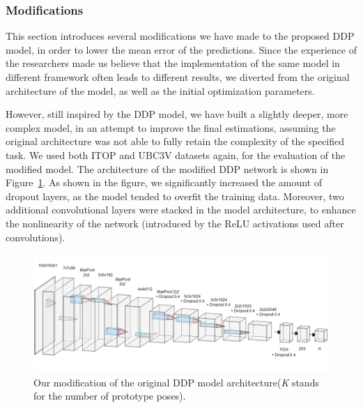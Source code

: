 \subsubsection{Modifications}
This section introduces several modifications we have made to the proposed DDP model, in order to lower the mean error of the predictions. Since the experience of the researchers made us believe that the implementation of the same model in different framework often leads to different results, we diverted from the original architecture of the model, as well as the initial optimization parameters.\par
\vspace{5mm}

\noindent
However, still inspired by the DDP model, we have built a slightly deeper, more complex model, in an attempt to improve the final estimations, assuming the original architecture was not able to fully retain the complexity of the specified task. We used both ITOP and UBC3V datasets again, for the evaluation of the modified model.
The architecture of the modified DDP network is shown in Figure~\ref{fig:mddp}. As shown in the figure, we significantly increased the amount of dropout layers, as the model tended to overfit the training data. Moreover, two additional convolutional layers were stacked in the model architecture, to enhance the nonlinearity of the network (introduced by the ReLU activations used after convolutions).\par
\vspace{5mm}

\begin{figure}[H]
\begin{center}
  \includegraphics[width=\textwidth]{images/implementation/mddp.png}
  \caption[Our modification of the original DDP model architecture.]{Our modification of the original DDP model architecture\break (\textit{K} stands for the number of prototype poses).}
  \label{fig:mddp}
\end{center}
\end{figure}


